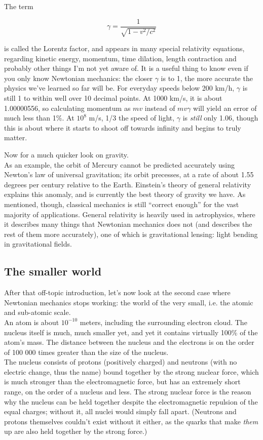 The term

\begin{equation}
\gamma = \frac{1}{\sqrt{1 - v^2/c^2}}
\end{equation}

is called the Lorentz factor, and appears in many special relativity equations, regarding kinetic energy, momentum, time dilation, length contraction and probably other things I'm not yet aware of. It is a useful thing to know even if you only know Newtonian mechanics: the closer $\gamma$ is to 1, the more accurate the physics we've learned so far will be. For everyday speeds below 200 km/h, $\gamma$ is still 1 to within well over 10 decimal points. At 1000 km/s, it is about 1.00000556, so calculating momentum as $m v$ instead of $m v \gamma$ will yield an error of much less than 1\%. At $10^8$ m/s, 1/3 the speed of light, $\gamma$ is \emph{still} only 1.06, though this is about where it starts to shoot off towards infinity and begins to truly matter.

Now for a much quicker look on gravity.\\
As an example, the orbit of Mercury cannot be predicted accurately using Newton's law of universal gravitation; its orbit precesses, at a rate of about 1.55 degrees per century relative to the Earth. Einstein's theory of general relativity explains this anomaly, and is currently the best theory of gravity we have. As mentioned, though, classical mechanics is still ``correct enough'' for the vast majority of applications. General relativity is heavily used in astrophysics, where it describes many things that Newtonian mechanics does not (and describes the rest of them more accurately), one of which is gravitational lensing: light bending in gravitational fields.

\subsection{The smaller world}

After that off-topic introduction, let's now look at the second case where Newtonian mechanics stops working: the world of the very small, i.e. the atomic and sub-atomic scale.\\
An atom is about $10^{-10}$ meters, including the surrounding electron cloud. The nucleus itself is much, much smaller yet, and yet it contains virtually 100\% of the atom's mass. The distance between the nucleus and the electrons is on the order of 100 000 times greater than the size of the nucleus.\\
The nucleus consists of protons (positively charged) and neutrons (with no electric change, thus the name) bound together by the strong nuclear force, which is much stronger than the electromagnetic force, but has an extremely short range, on the order of a nucleus and less. The strong nuclear force is the reason why the nucleus can be held together despite the electromagnetic repulsion of the equal charges; without it, all nuclei would simply fall apart. (Neutrons and protons themselves couldn't exist without it either, as the quarks that make \emph{them} up are also held together by the strong force.)

